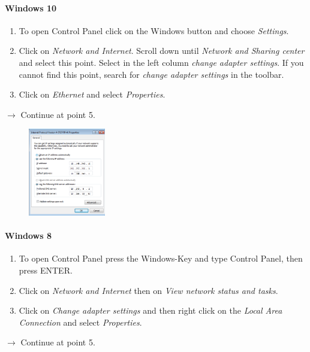 \documentclass[a4paper,12pt]{scrartcl}
\begin{document}
\paragraph*{Windows 10}
\begin{enumerate}
    \item To open Control Panel click on the Windows button and choose \emph{Settings}.
    \item Click on \emph{Network and Internet}. Scroll down until \emph{Network and Sharing center} and select this point. Select in the left column \textit{change adapter settings}. If you cannot find this point, search for \emph{change adapter settings} in the toolbar.
    \item Click on \emph{Ethernet} and select \emph{Properties}.
\end{enumerate}
$\rightarrow$ Continue at point 5.

\begin{figure}
\centering
  \includegraphics[width=0.3\textwidth]{Bilder/IP_Windows_EN_mb}
\end{figure}

\paragraph*{Windows 8}
\begin{enumerate}	
	\item To open Control Panel press the Windows-Key and type Control Panel, then press ENTER.
    \item Click on \emph{Network and Internet} then on \emph{View network status and tasks}.
	\item Click on \emph{Change adapter settings} and then right click on the \emph{Local Area Connection} and select \emph{Properties}.
\end{enumerate}
$\rightarrow$ Continue at point 5.
\end{document}
